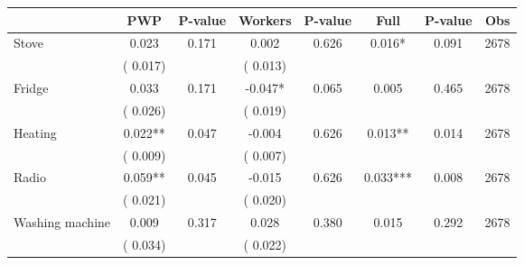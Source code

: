 
\begin{tabular}{l*{7}{c}}\hline&\multicolumn{1}{c}{PWP}&\multicolumn{1}{c}{P-value}&\multicolumn{1}{c}{Workers}&\multicolumn{1}{c}{P-value}&\multicolumn{1}{c}{Full}&\multicolumn{1}{c}{P-value}&\multicolumn{1}{c}{Obs} \\ \hline

 Stove       &              0.023       &        0.171  &              0.002       &        0.626  &              0.016*       &              0.091 &  2678 \\ 
                       &       (       0.017)             &                               &       (       0.013)                     &                               &                                               &                                &                      \\ 

 Fridge       &              0.033       &        0.171  &             -0.047*       &        0.065  &              0.005       &              0.465 &  2678 \\ 
                       &       (       0.026)             &                               &       (       0.019)                     &                               &                                               &                                &                      \\ 

 Heating       &              0.022**       &        0.047  &             -0.004       &        0.626  &              0.013**       &              0.014 &  2678 \\ 
                       &       (       0.009)             &                               &       (       0.007)                     &                               &                                               &                                &                      \\ 

 Radio       &              0.059**       &        0.045  &             -0.015       &        0.626  &              0.033***       &              0.008 &  2678 \\ 
                       &       (       0.021)             &                               &       (       0.020)                     &                               &                                               &                                &                      \\ 

 Washing machine       &              0.009       &        0.317  &              0.028       &        0.380  &              0.015       &              0.292 &  2678 \\ 
                       &       (       0.034)             &                               &       (       0.022)                     &                               &                                               &                                &                      \\ 


\end{tabular}
